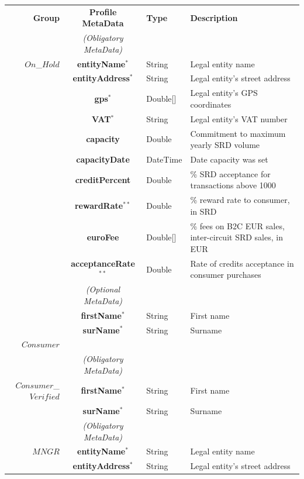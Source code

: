 \setlength{\tabcolsep}{5pt}
\begin{table}[H]
\begin{centering}
\small
{
\begin{tabular}{ r | c | l | l }
\hline
\textbf{Group}	& {\bf Profile MetaData} & {\bf Type} & {\bf Description} \\
\Xhline{1.5pt}
			& \emph{(Obligatory MetaData)} & & \\
\cline{2-2}
$On$\_$Hold$	& {\bf entityName}$^*$		&String	& Legal entity name \\
			& {\bf entityAddress}$^*$		&String	& Legal entity's street address \\
			& {\bf gps}$^*$				&Double[]	& Legal entity's GPS coordinates \\
			& {\bf VAT}$^*$				&String	& Legal entity's VAT number \\
			& {\bf capacity}				&Double	& Commitment to maximum yearly SRD volume \\
			& {\bf capacityDate}			&DateTime & Date capacity was set \\
			& {\bf creditPercent}			&Double	& \% SRD acceptance for transactions above 1000 \\
			& {\bf rewardRate}$^{**}$		&Double	& \% reward rate to consumer, in SRD \\
			& {\bf euroFee}				&Double[]	& \% fees on B2C EUR sales, inter-circuit SRD sales, in EUR \\			& {\bf acceptanceRate}$^{**}$	&Double	& Rate of credits acceptance in consumer purchases\\
\cline{2-2}
			 & \emph{(Optional MetaData)}& & \\
\cline{2-2}
			& {\bf firstName}$^*$			&String	& First name \\
			& {\bf surName}$^*$			&String	& Surname \\
\Xhline{1.5pt}
$Consumer$	& 	& &  \\
\Xhline{1.5pt}
			& \emph{(Obligatory MetaData)} & & \\
\cline{2-2}
$Consumer$\_$Verified$ & {\bf firstName}$^*$	&String	& First name \\
			& {\bf surName}$^*$			&String	& Surname \\
\Xhline{1.5pt}
			& \emph{(Obligatory MetaData)} & & \\
\cline{2-2}
$MNGR$ 		& {\bf entityName}$^*$		&String	& Legal entity name \\
			& {\bf entityAddress}$^*$		&String	& Legal entity's street address \\

\end{tabular}}
\end{centering}
\end{table}
